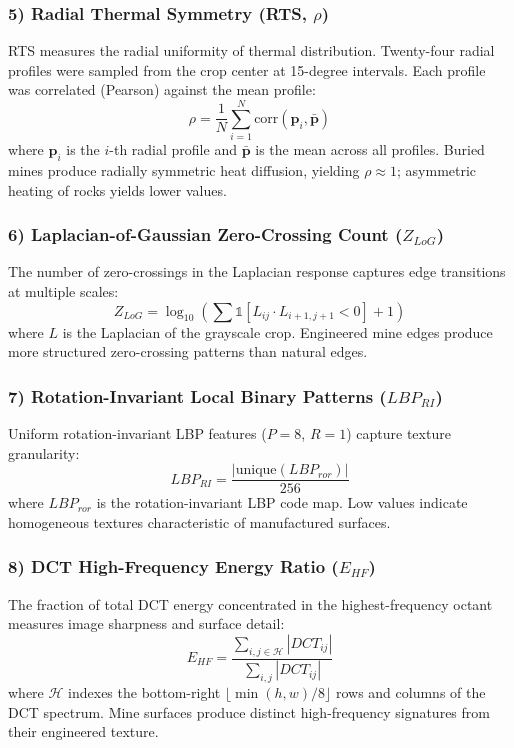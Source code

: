 \documentclass[conference]{IEEEtran}
\begin{document}
\subsubsection*{5) Radial Thermal Symmetry (RTS, $\rho$)}
RTS measures the radial uniformity of thermal distribution. Twenty-four radial profiles were sampled from the crop center at 15-degree intervals. Each profile was correlated (Pearson) against the mean profile:
\begin{equation}
  \rho = \frac{1}{N} \sum_{i=1}^{N} \mathrm{corr}(\mathbf{p}_i, \bar{\mathbf{p}})
\end{equation}
where $\mathbf{p}_i$ is the $i$-th radial profile and $\bar{\mathbf{p}}$ is the mean across all profiles. Buried mines produce radially symmetric heat diffusion, yielding $\rho \approx 1$; asymmetric heating of rocks yields lower values.

\subsubsection*{6) Laplacian-of-Gaussian Zero-Crossing Count ($Z_{LoG}$)}
The number of zero-crossings in the Laplacian response captures edge transitions at multiple scales:
\begin{equation}
  Z_{LoG} = \log_{10}\left(\sum \mathbb{1}[L_{ij} \cdot L_{i+1,j+1} < 0] + 1\right)
\end{equation}
where $L$ is the Laplacian of the grayscale crop. Engineered mine edges produce more structured zero-crossing patterns than natural edges.

\subsubsection*{7) Rotation-Invariant Local Binary Patterns ($LBP_{RI}$)}
Uniform rotation-invariant LBP features ($P = 8$, $R = 1$) capture texture granularity:
\begin{equation}
  LBP_{RI} = \frac{|\mbox{unique}(LBP_{ror})|}{256}
\end{equation}
where $LBP_{ror}$ is the rotation-invariant LBP code map. Low values indicate homogeneous textures characteristic of manufactured surfaces.

\subsubsection*{8) DCT High-Frequency Energy Ratio ($E_{HF}$)}
The fraction of total DCT energy concentrated in the highest-frequency octant measures image sharpness and surface detail:
\begin{equation}
  E_{HF} = \frac{\sum_{i,j \in \mathcal{H}} |DCT_{ij}|}{\sum_{i,j} |DCT_{ij}|}
\end{equation}
where $\mathcal{H}$ indexes the bottom-right $\lfloor \min(h,w)/8 \rfloor$ rows and columns of the DCT spectrum. Mine surfaces produce distinct high-frequency signatures from their engineered texture.
\end{document}
